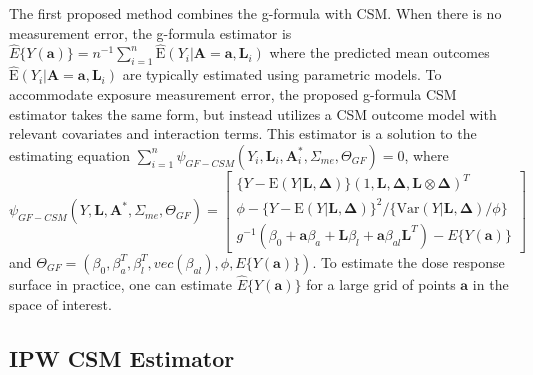 \documentclass[useAMS,usenatbib,referee]{biom}
\begin{document}
\sloppy The first proposed method combines the g-formula with CSM. When there is no measurement error, the g-formula estimator is $\hat{E}\{ Y(\bm{a}) \} = n^{-1} \sum_{i=1}^{n} \hat{\text{E}}(Y_{i} | \bm{A} = \bm{a}, \bm{L}_{i})$ where the predicted mean outcomes $\hat{\text{E}}(Y_{i} | \bm{A} = \bm{a}, \bm{L}_{i})$ are typically estimated using parametric models. To accommodate exposure measurement error, the proposed g-formula CSM estimator takes the same form, but instead utilizes a CSM outcome model with relevant covariates and interaction terms. This estimator is a solution to the estimating equation $\sum_{i=1}^{n} \psi_{GF-CSM}(Y_{i}, \bm{L}_{i}, \bm{A}_{i}^{*}, \Sigma_{me}, \Theta_{GF}) = 0$, where
\begin{equation}
    \psi_{GF-CSM}(Y, \bm{L}, \bm{A}^{*}, \Sigma_{me}, \Theta_{GF}) =
    \begin{bmatrix}
       \{ Y - \text{E}(Y | \bm{L}, \bm{\Delta}) \} (1, \bm{L}, \bm{\Delta}, \bm{L} \otimes \bm{\Delta})^{T} \\
        \phi - \{ Y - \text{E}(Y | \bm{L}, \bm{\Delta}) \}^{2} / \{ \text{Var}(Y | \bm{L}, \bm{\Delta}) / \phi \} \\
        g^{-1}(\beta_{0} + \bm{a}\beta_{a} + \bm{L}\beta_{l} +
        \bm{a}\beta_{al}\bm{L}^{T}) - E \{ Y(\bm{a}) \}
    \end{bmatrix}
\end{equation}
and $\Theta_{GF} = (\beta_{0}, \beta^{T}_{a}, \beta^{T}_{l}, vec(\beta_{al}), \phi, E \{ Y(\bm{a}) \})$. To estimate the dose response surface in practice, one can estimate $\hat{E}\{ Y(\bm{a}) \}$ for a large grid of points $\bm{a}$ in the space of interest.

\subsection{IPW CSM Estimator}
\end{document}
